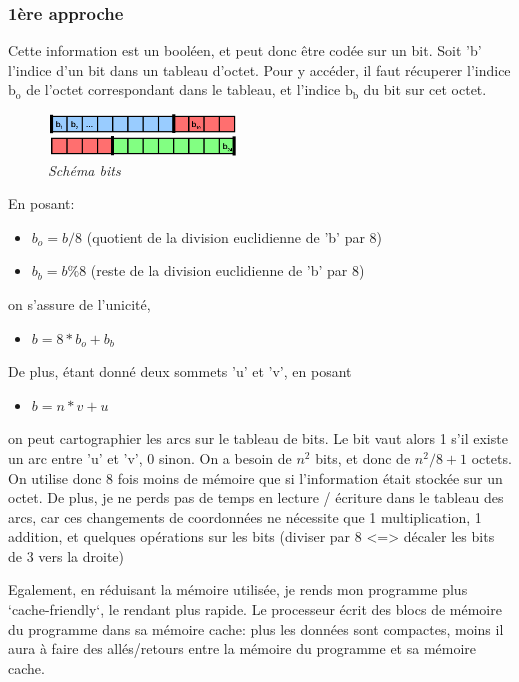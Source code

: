 \documentclass[10pt]{article}
\begin{document}
			\subsubsection{1ère approche}

				Cette information est un booléen, et peut donc être codée sur un bit.
				Soit 'b' l'indice d'un bit dans un tableau d'octet.
				Pour y accéder, il faut récuperer l'indice $\textrm{b}_\textrm{o}$ de l'octet correspondant dans le tableau,
				et l'indice $\textrm{b}_\textrm{b}$ du bit sur cet octet.\newline
				
				\begin{figure}
					\includegraphics[width=5cm]{./images/bits.png}
					\caption{\textit{Schéma bits}}
				\end{figure}
				
				En posant:
				\begin{itemize}[label=-]
					\item \(b_o = b / 8\) (quotient de la division euclidienne de 'b' par 8)
					\item \(b_b = b \% 8\) (reste de la division euclidienne de 'b' par 8)
				\end{itemize}
				on s'assure de l'unicité,
				\begin{itemize}[label=-]
					\item \(b = 8*b_o+b_b\)
				\end{itemize}
				De plus, étant donné deux sommets 'u' et 'v', en posant
				\begin{itemize}[label=-]
					\item \(b = n * v + u\)
				\end{itemize}
				on peut cartographier les arcs sur le tableau de bits. Le bit vaut alors 1 s'il existe un arc entre 'u' et 'v', 0 sinon.
				On a besoin de \(n^2\) bits, et donc de \(n^2 / 8 + 1\) octets.
				On utilise donc 8 fois moins de mémoire que si l'information était stockée sur un octet.
				De plus, je ne perds pas de temps en lecture / écriture dans le tableau des arcs, car ces changements
				de coordonnées ne nécessite que 1 multiplication, 1 addition, et quelques opérations sur les bits (diviser par 8 <=> décaler
				les bits de 3 vers la droite)
				
				Egalement, en réduisant la mémoire utilisée, je rends mon programme plus `cache-friendly`, le rendant plus rapide.
				Le processeur écrit des blocs de mémoire du programme dans sa mémoire cache: plus les données sont compactes,
				moins il aura à faire des allés/retours entre la mémoire du programme et sa mémoire cache.\newline
				
\end{document}
